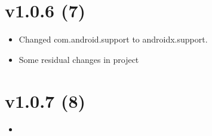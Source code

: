 \documentclass{article}
\begin{document}
    \section{v1.0.6 (7)}\label{sec:7}
    \begin{itemize}
        \item Changed com.android.support to androidx.support.
        \item Some residual changes in project
    \end{itemize}


    \section{v1.0.7 (8)}\label{sec:8}
    \begin{itemize}
        \item
    \end{itemize}
\end{document}
